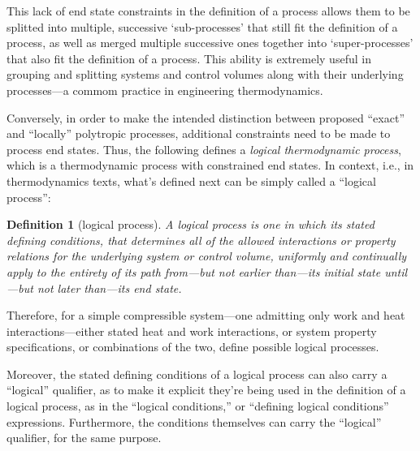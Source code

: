 \documentclass[fleqn,11pt]{SelfArx}
\newtheorem{definition}{Definition}
\begin{document}
    This lack of end state constraints in the definition of a process allows them to be splitted
    into multiple, successive `sub-processes' that still fit the definition  of  a  process,  as
    well as merged multiple successive ones together into `super-processes' that  also  fit  the
    definition of a process. This ability is extremely useful in grouping and splitting  systems
    and control volumes along with their underlying processes---a commom practice in engineering
    thermodynamics.

    Conversely, in order to  make  the  intended  distinction  between  proposed  ``exact''  and
    ``locally'' polytropic processes, additional constraints need to  be  made  to  process  end
    states. Thus, the following defines a  \emph{logical  thermodynamic  process},  which  is  a
    thermodynamic process with constrained end  states.  In  context,  i.e.,  in  thermodynamics
    texts, what's defined next can be simply called a ``logical process'':

    \begin{definition}[logical process]\label{def:logical.proc}
        A logical process is one in which its stated defining conditions, that determines all of
        the allowed interactions or property relations for  the  underlying  system  or  control
        volume, uniformly and continually apply to the  entirety  of  its  path  from---but  not
        earlier than---its initial state until---but not later than---its end state.
    \end{definition}

    Therefore,  for  a  simple  compressible  system---one  admitting   only   work   and   heat
    interactions---either stated heat and work interactions, or system property  specifications,
    or combinations of the two, define possible logical processes.

    Moreover, the stated defining conditions of a logical process can also carry  a  ``logical''
    qualifier, as to make it explicit they're being used in the definition of a logical process,
    as  in  the  ``logical  conditions,''  or  ``defining  logical   conditions''   expressions.
    Furthermore, the conditions themselves can carry the ``logical''  qualifier,  for  the  same
    purpose.
\end{document}
